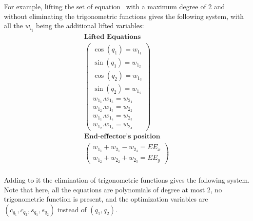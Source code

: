 For example, lifting the set of equation~ with a maximum degree of 2 and without eliminating the trigonometric functions gives the following system, with all the $w_{i_j}$ being the additional lifted variables:
\begin{equation}
  \begin{array}{c}
  \textbf{Lifted Equations}\\
  \left(
    \begin{array}{c}
      \cos(q_1) = w_{1_1}\\
      \sin(q_1) = w_{1_2}\\
      \cos(q_2) = w_{1_3}\\
      \sin(q_2) = w_{1_4}\\
      w_{1_1}.w_{1_3} = w_{2_1}\\
      w_{1_2}.w_{1_3} = w_{2_2}\\
      w_{1_1}.w_{1_4} = w_{2_3}\\
      w_{1_2}.w_{1_4} = w_{2_4}
    \end{array}
  \right)\\
  \textbf{End-effector's position}\\
  \left(\begin{array}{c}
      w_{1_1} + w_{2_1} - w_{2_4} = EE_x\\
      w_{1_2} + w_{2_2} + w_{2_3} = EE_y
    \end{array}
  \right)\\
  \end{array}
\end{equation}
\label{eq:lifted_equations}

Adding to it the elimination of trigonometric functions gives the following system.
Note that here, all the equations are polynomials of degree at most 2, no trigonometric function is present, and the optimization variables are $\left(c_{q_1}, c_{q_2}, s_{q_1}, s_{q_2}\right)$ instead of $\left(q_1, q_2\right)$.

